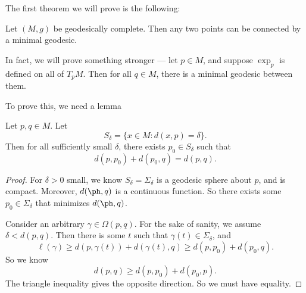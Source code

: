 \documentclass[a4paper]{article}
\begin{document}
The first theorem we will prove is the following:
\begin{thm}
  Let $(M, g)$ be geodesically complete. Then any two points can be connected by a minimal geodesic.
\end{thm}
In fact, we will prove something stronger --- let $p \in M$, and suppose $\exp_p$ is defined on all of $T_p M$. Then for all $q \in M$, there is a minimal geodesic between them.

To prove this, we need a lemma
\begin{lemma}
  Let $p, q \in M$. Let
  \[
    S_\delta = \{x \in M: d(x, p) = \delta\}.
  \]
  Then for all sufficiently small $\delta$, there exists $p_0 \in S_\delta$ such that
  \[
    d(p, p_0) + d(p_0, q) = d(p, q).
  \]
\end{lemma}
\begin{proof}
  For $\delta > 0$ small, we know $S_\delta = \Sigma_\delta$ is a geodesic sphere about $p$, and is compact. Moreover, $d(\ph, q)$ is a continuous function. So there exists some $p_0 \in \Sigma_\delta$ that minimizes $d(\ph, q)$.

  Consider an arbitrary $\gamma \in \Omega(p, q)$. For the sake of sanity, we assume $\delta < d(p, q)$. Then there is some $t$ such that $\gamma(t) \in \Sigma_\delta$, and
  \[
    \ell(\gamma) \geq d(p, \gamma(t)) + d(\gamma(t), q) \geq d(p, p_0) + d(p_0, q).
  \]
  So we know
  \[
    d(p, q) \geq d(p, p_0) + d(p_0, p).
  \]
  The triangle inequality gives the opposite direction. So we must have equality.
\end{proof}
\end{document}
